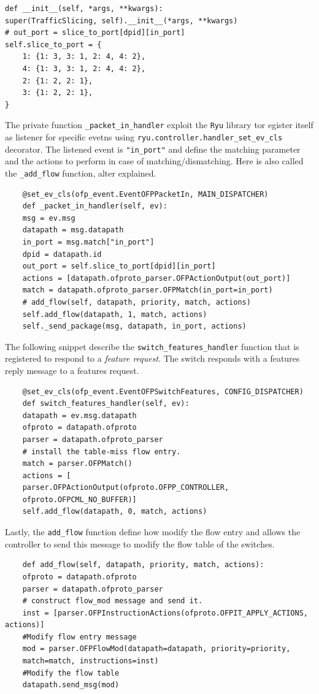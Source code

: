 \documentclass[10pt,a4paper]{report}
\theoremstyle{definition}
\begin{document}
\begin{lstlisting}
def __init__(self, *args, **kwargs):
super(TrafficSlicing, self).__init__(*args, **kwargs)
# out_port = slice_to_port[dpid][in_port]
self.slice_to_port = {
	1: {1: 3, 3: 1, 2: 4, 4: 2},
	4: {1: 3, 3: 1, 2: 4, 4: 2},
	2: {1: 2, 2: 1},
	3: {1: 2, 2: 1},
}
\end{lstlisting}

The private function \texttt{\_packet\_in\_handler} exploit the \texttt{Ryu} library tor egister itself as listener for specific evetns using \texttt{ryu.controller.handler\_set\_ev\_cls} decorator. The listened event is \texttt{"in\_port"} and define the matching parameter and the actions to perform in case of matching/dismatching. Here is also called the \texttt{\_add\_flow} function, alter explained.

\begin{lstlisting}
	@set_ev_cls(ofp_event.EventOFPPacketIn, MAIN_DISPATCHER)
	def _packet_in_handler(self, ev):
	msg = ev.msg
	datapath = msg.datapath
	in_port = msg.match["in_port"]
	dpid = datapath.id
	out_port = self.slice_to_port[dpid][in_port]
	actions = [datapath.ofproto_parser.OFPActionOutput(out_port)]
	match = datapath.ofproto_parser.OFPMatch(in_port=in_port)
	# add_flow(self, datapath, priority, match, actions)
	self.add_flow(datapath, 1, match, actions)
	self._send_package(msg, datapath, in_port, actions)
\end{lstlisting}


The following snippet describe the \texttt{switch\_features\_handler} function that is registered to respond to a \textit{feature request}. The switch responds with a features reply message to a features request. 

\begin{lstlisting}
	@set_ev_cls(ofp_event.EventOFPSwitchFeatures, CONFIG_DISPATCHER)
	def switch_features_handler(self, ev):
	datapath = ev.msg.datapath
	ofproto = datapath.ofproto
	parser = datapath.ofproto_parser
	# install the table-miss flow entry.
	match = parser.OFPMatch()
	actions = [
	parser.OFPActionOutput(ofproto.OFPP_CONTROLLER,
	ofproto.OFPCML_NO_BUFFER)]
	self.add_flow(datapath, 0, match, actions) 
\end{lstlisting}
Lastly, the \texttt{add\_flow} function define how modify the flow entry and allows the controller to send this message to modify the flow table of the switches.
\begin{lstlisting}
	def add_flow(self, datapath, priority, match, actions):
	ofproto = datapath.ofproto
	parser = datapath.ofproto_parser
	# construct flow_mod message and send it.
	inst = [parser.OFPInstructionActions(ofproto.OFPIT_APPLY_ACTIONS, actions)]
	#Modify flow entry message
	mod = parser.OFPFlowMod(datapath=datapath, priority=priority,
	match=match, instructions=inst)
	#Modify the flow table
	datapath.send_msg(mod)
\end{lstlisting}
\end{document}
